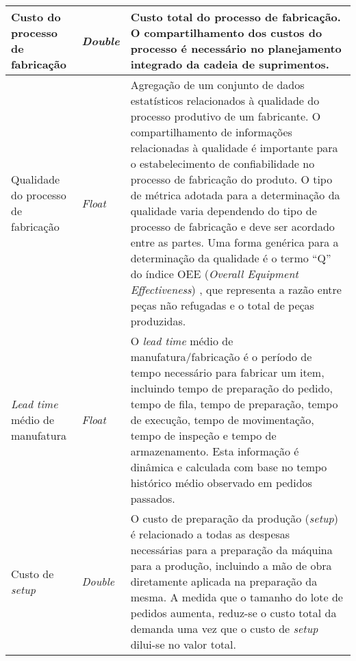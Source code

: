 \begin{longtable}{p{} p{} p{}}
	\hline
	Custo do processo de fabricação
	 & \textit{Double}
	 & Custo total do processo de fabricação. O compartilhamento dos custos do processo é necessário no planejamento integrado da cadeia de suprimentos.                                                                                                                                                                                                                                                                                                                                                                                                                                                                                                              \\
	\hline
	Qualidade do processo de fabricação
	 & \textit{Float}
	 & Agregação de um conjunto de dados estatísticos relacionados à qualidade do processo produtivo de um fabricante. O compartilhamento de informações relacionadas à qualidade é importante para o estabelecimento de confiabilidade no processo de fabricação do produto. O tipo de métrica adotada para a determinação da qualidade varia dependendo do tipo de processo de fabricação e deve ser acordado entre as partes. Uma forma genérica para a determinação da qualidade é o termo ``Q'' do índice OEE (\textit{Overall Equipment Effectiveness}) \cite{corrales2020oee}, que representa a razão entre peças não refugadas e o total de peças produzidas. \\


	\hline
	\textit{Lead time} médio de manufatura
	 & \textit{Float}
	 & O \textit{lead time} médio de manufatura/fabricação é o período de tempo necessário para fabricar um item, incluindo tempo de preparação do pedido, tempo de fila, tempo de preparação, tempo de execução, tempo de movimentação, tempo de inspeção e tempo de armazenamento. Esta informação é dinâmica e calculada com base no tempo histórico médio observado em pedidos passados.                                                                                                                                                                                                                                                                          \\

	\hline
	Custo de \textit{setup}
	 & \textit{Double}
	 & O custo de preparação da produção (\textit{setup}) é relacionado a todas as despesas necessárias para a preparação da máquina para a produção, incluindo a mão de obra diretamente aplicada na preparação da mesma. A medida que o tamanho do lote de pedidos aumenta, reduz-se o custo total da demanda uma vez que o custo de \textit{setup} dilui-se no valor total.                                                                                                                                                                                                                                                                                        \\


\end{longtable}
